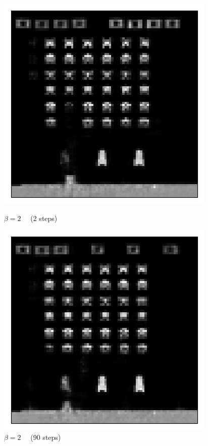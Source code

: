 \begin{figure}[h!]
\begin{multicols}{4}
    \includegraphics[scale=0.4]{figures/results/indiscriminate_decoupling/beta_2_posterior_sample_1.png}
    \caption{$\beta=2\quad$ (2 steps)}
    \includegraphics[scale=0.4]{figures/results/indiscriminate_decoupling/beta_2_posterior_sample_90.png}
    \caption{$\beta=2\quad$ (90 steps)}
\end{multicols}


\end{figure}
